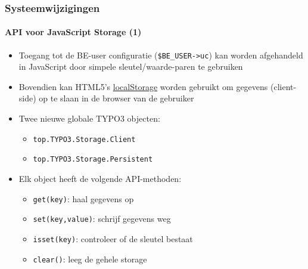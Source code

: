 
\begin{frame}[fragile]
	\frametitle{Systeemwijzigingen}
	\framesubtitle{API voor JavaScript Storage (1)}

	\begin{itemize}
		\item Toegang tot de BE-user configuratie (\texttt{\$BE\_USER->uc}) kan worden
			afgehandeld in JavaScript door simpele sleutel/waarde-paren te gebruiken
		\item Bovendien kan HTML5's \href{http://www.w3.org/TR/webstorage/}{localStorage}
			worden gebruikt om gegevens (client-side) op te slaan in de browser van de gebruiker

		\item Twee nieuwe globale TYPO3 objecten:
			\begin{itemize}
				\item \texttt{top.TYPO3.Storage.Client}
				\item \texttt{top.TYPO3.Storage.Persistent}
			\end{itemize}

		\item Elk object heeft de volgende API-methoden:
			\begin{itemize}
				\item \texttt{get(key)}: haal gegevens op
				\item \texttt{set(key,value)}: schrijf gegevens weg
				\item \texttt{isset(key)}: controleer of de sleutel bestaat
				\item \texttt{clear()}: leeg de gehele storage
			\end{itemize}

	\end{itemize}

\end{frame}



